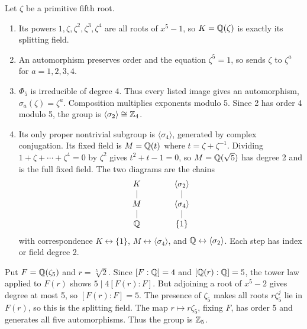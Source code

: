 Let $\zeta$ be a primitive fifth root.
\begin{enumerate}[label=(\alph*)]
\item Its powers $1,\zeta,\zeta^2,\zeta^3,\zeta^4$ are all roots of $x^5-1$, so $K=\mathbb{Q}(\zeta)$ is exactly its splitting field.
\item An automorphism preserves order and the equation $\zeta^5=1$, so sends $\zeta$ to $\zeta^a$ for $a=1,2,3,4$.
\item $\Phi_5$ is irreducible of degree 4. Thus every listed image gives an automorphism, $\sigma_a(\zeta)=\zeta^a$. Composition multiplies exponents modulo 5. Since 2 has order 4 modulo 5, the group is $\langle\sigma_2\rangle\cong\mathbb{Z}_4$.
\item Its only proper nontrivial subgroup is $\langle\sigma_4\rangle$, generated by complex conjugation. Its fixed field is $M=\mathbb{Q}(t)$ where $t=\zeta+\zeta^{-1}$. Dividing $1+\zeta+\cdots+\zeta^4=0$ by $\zeta^2$ gives $t^2+t-1=0$, so $M=\mathbb{Q}(\sqrt5)$ has degree 2 and is the full fixed field. The two diagrams are the chains
\[
\begin{array}{c@{\qquad\qquad}c}
K&\langle\sigma_2\rangle\\
\vert&\vert\\
M&\langle\sigma_4\rangle\\
\vert&\vert\\
\Q&\{1\}
\end{array}
\]
with correspondence $K\leftrightarrow\{1\}$, $M\leftrightarrow\langle\sigma_4\rangle$, and $\mathbb{Q}\leftrightarrow\langle\sigma_2\rangle$. Each step has index or field degree 2.
\end{enumerate}

Put $F=\mathbb{Q}(\zeta_5)$ and $r=\sqrt[5]2$. Since $[F:\mathbb{Q}]=4$ and $[\mathbb{Q}(r):\mathbb{Q}]=5$, the tower law applied to $F(r)$ shows $5\mid4[F(r):F]$. But adjoining a root of $x^5-2$ gives degree at most 5, so $[F(r):F]=5$. The presence of $\zeta_5$ makes all roots $r\zeta_5^j$ lie in $F(r)$, so this is the splitting field. The map $r\mapsto r\zeta_5$, fixing $F$, has order 5 and generates all five automorphisms. Thus the group is $\mathbb{Z}_5$.

